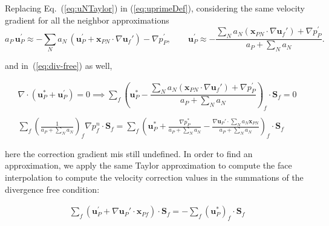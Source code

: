 \documentclass[final,3p,times,10pt,onecolumn]{myElsarticle}
\numberwithin{equation}{section}
\begin{document}
Replacing Eq.~(\ref{eq:uNTaylor}) in (\ref{eq:uprimeDef}), considering the same velocity gradient for all the neighbor approximations
\begin{equation}\label{eq:uPrimeCOMPLEX}
a_P\,\boldsymbol{u}_P^{'} \approx -\sum_{N} a_{N}\, \left(\boldsymbol{u}_P^{'} + \boldsymbol{x}_{PN}\cdot \nabla \boldsymbol{u}_f'\right)- \nabla p_P^{'}, \qquad \boldsymbol{u}_P^{'} \approx - \dfrac{ \sum_{N} a_{N} 
( \boldsymbol{x}_{PN} \cdot \nabla \boldsymbol{u}_f' ) 
+ \nabla p_P^{'}}{a_P + \sum_{N} a_{N}} .
\end{equation}

\noindent and in~(\ref{eq:div-free}) as well,

\begin{equation}\label{eq:pEqnCOMPLEX}
\begin{split}
\nabla \cdot \left(\boldsymbol{u}_P^{*} + \boldsymbol{u}_P^{'}\right) = 0 \implies
\sum_f \left(\boldsymbol{u}_P^{*} - \dfrac{ \sum_{N} a_{N}
( \boldsymbol{x}_{PN} \cdot \nabla \boldsymbol{u}_f' ) 
+ \nabla p_P^{'}}{a_P + \sum_{N} a_{N}}\right)_f \cdot \boldsymbol{S}_f
= 0 
\\
\\
\sum_f \left(\frac{1}{a_P + \sum_{N} a_{N}}\right)_f \nabla p_f^{n} \cdot \boldsymbol{S}_f
= \sum_f \left(\boldsymbol{u}_P^{*} + \frac{\nabla p_P^{*}}{a_P + \sum_{N} a_{N}} - \frac{\nabla \boldsymbol{u}_P' \cdot \sum_{N} a_{N}\boldsymbol{x}_{PN}}{a_P + \sum_{N} a_{N}}\right)_f \cdot \boldsymbol{S}_f
\end{split}
\end{equation}

\noindent here the correction gradient mis still undefined. In order to find an approximation, we apply the same Taylor approximation to compute the face interpolation to compute the velocity correction values in the summations of the divergence free condition:

\begin{equation}\label{eq:ugradDef1}
\begin{split}
\sum_f \left(\boldsymbol{u}_P^{'} + \nabla \boldsymbol{u}_P' \cdot \boldsymbol{x}_{Pf}\right)
\cdot
\boldsymbol{S}_f
= -\sum_f \left(\boldsymbol{u}_P^{*}\right)_f \cdot \boldsymbol{S}_f
\end{split}
\end{equation}
\end{document}
